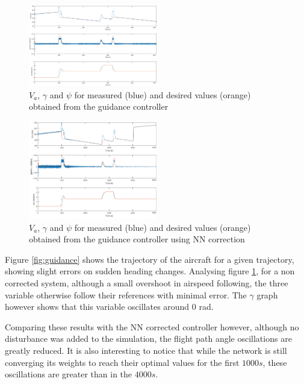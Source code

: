 \begin{figure}[h]
\centering
\includegraphics[width=0.5\textwidth]{../Figures/Results/guidance_ref.png}
\caption[Reference following of $V_a$, $\gamma$ and $\psi$ from guidance controller]{$V_a$, $\gamma$ and $\psi$ for measured (blue) and desired values (orange) obtained from the guidance controller}
\label{fig:guidance_ref}
\end{figure}

\begin{figure}[h]
\centering
\includegraphics[width=0.5\textwidth]{../Figures/Results/guidance_ref_NN.png}
\caption[Reference following of $V_a$, $\gamma$ and $\psi$ from guidance controller with NN correction]{$V_a$, $\gamma$ and $\psi$ for measured (blue) and desired values (orange) obtained from the guidance controller using NN correction}
\label{fig:guidance_ref_NN}
\end{figure}

Figure \ref{fig:guidance} shows the trajectory of the aircraft for a given trajectory, showing slight errors on sudden heading changes. Analysing figure \ref{fig:guidance_ref}, for a non corrected system, although a small overshoot in airspeed following, the three variable otherwise follow their references with minimal error. The $\gamma$ graph however shows that this variable oscillates around $0$ rad.

Comparing these results with the NN corrected controller however, although no disturbance was added to the simulation, the flight path angle oscillations are greatly reduced. It is also interesting to notice that while the network is still converging its weights to reach their optimal values for the first $1000s$, these oscillations are greater than in the $4000s$.